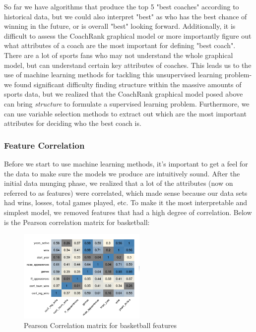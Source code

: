 \documentclass[11pt,notitlepage]{article}
\begin{document}
\noindent So far we have algorithms that produce the top 5 "best coaches" according to historical data, but we could also interpret "best" as who has the best chance of winning in the future, or is overall "best" looking forward. Additionally, it is difficult to assess the CoachRank graphical model or more importantly figure out what attributes of a coach are the most important for defining "best coach". There are a lot of sports fans who may not understand the whole graphical model, but can understand certain key attributes of coaches. This leads us to the use of machine learning methods for tackling this unsupervised learning problem- we found significant difficulty finding structure within the massive amounts of sports data, but we realized that the CoachRank graphical model posed above can bring \textit{structure} to formulate a supervised learning problem. Furthermore, we can use variable selection methods to extract out which are the most important attributes for deciding who the best coach is. 

\subsubsection*{Feature Correlation}

\noindent Before we start to use machine learning methods, it's important to get a feel for the data to make sure the models we produce are intuitively sound. After the initial data munging phase, we realized that a lot of the attributes (now on referred to as features) were correlated, which made sense because our data sets had wins, losses, total games played, etc. To make it the most interpretable and simplest model, we removed features that had a high degree of correlation. Below is the Pearson correlation matrix for basketball: 

\begin{figure}[H]
      \caption{Pearson Correlation matrix for basketball features}
      \centering
      \includegraphics[width=0.55\textwidth]{bball_cor.png}
\end{figure}
\end{document}

